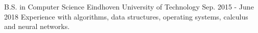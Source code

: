 
\begin{cventries}

  \cventry
    {B.S. in Computer Science} %
    {Eindhoven University of Technology} %
    {} %
    {Sep. 2015 - June 2018} %
    {
      {Experience with algorithms, data structures, operating systems, calculus and neural networks.}
    }

\end{cventries}
